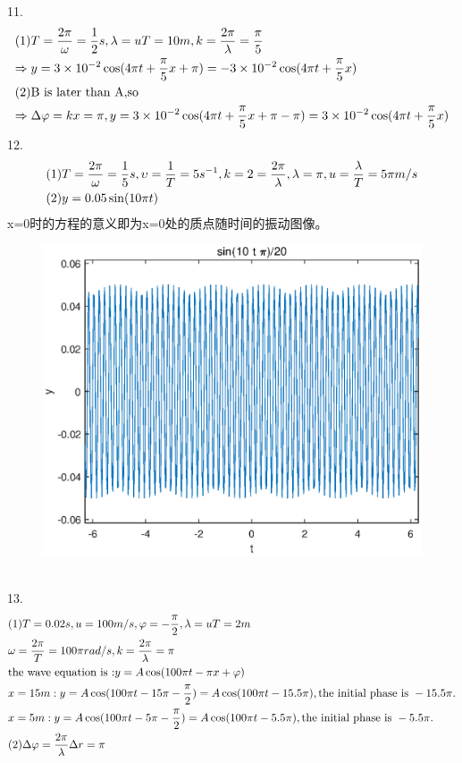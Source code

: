 \documentclass{article}
\begin{document}
11.\[\begin{gathered}
(1)T = \frac{{2\pi }}{\omega } = \frac{1}{2}s,\lambda  = uT = 10m,k = \frac{{2\pi }}{\lambda } = \frac{\pi }{5} \hfill \\
\Rightarrow y = 3 \times {10^{ - 2}}\cos (4\pi t + \frac{\pi }{5}x + \pi ) =  - 3 \times {10^{ - 2}}\cos (4\pi t + \frac{\pi }{5}x) \hfill \\
(2){\text{B is later than A,so}} \hfill \\
\Rightarrow \Delta \varphi  = kx = \pi ,y = 3 \times {10^{ - 2}}\cos (4\pi t + \frac{\pi }{5}x + \pi  - \pi ) = 3 \times {10^{ - 2}}\cos (4\pi t + \frac{\pi }{5}x) \hfill \\ 
\end{gathered} \]
12.\[\begin{gathered}
(1)T = \frac{{2\pi }}{\omega } = \frac{1}{5}s,\upsilon  = \frac{1}{T} = 5{s^{ - 1}},k = 2 = \frac{{2\pi }}{\lambda },\lambda  = \pi ,u = \frac{\lambda }{T} = 5\pi m/s \hfill \\
(2)y = 0.05\sin (10\pi t) \hfill \\ 
\end{gathered} \]
x=0时的方程的意义即为x=0处的质点随时间的振动图像。
\begin{figure}[!h]
	\includegraphics[width=1.05\textwidth]{10-12.eps}
\end{figure}\\
13.\[\begin{gathered}
(1)T = 0.02s,u = 100m/s,\varphi  =  - \frac{\pi }{2},\lambda  = uT = 2m \hfill \\
\omega  = \frac{{2\pi }}{T} = 100\pi rad/s,k = \frac{{2\pi }}{\lambda } = \pi  \hfill \\
{\text{the wave equation is :}}y = A\cos (100\pi t - \pi x + \varphi ) \hfill \\
x = 15m:y = A\cos (100\pi t - 15\pi  - \frac{\pi }{2}) = A\cos (100\pi t - 15.5\pi ),{\text{the initial phase is }} - 15.5\pi . \hfill \\
x = 5m:y = A\cos (100\pi t - 5\pi  - \frac{\pi }{2}) = A\cos (100\pi t - 5.5\pi ),{\text{the initial phase is }} - 5.5\pi . \hfill \\
(2)\Delta \varphi  = \frac{{2\pi }}{\lambda }\Delta r = \pi  \hfill \\ 
\end{gathered} \]
\end{document}

